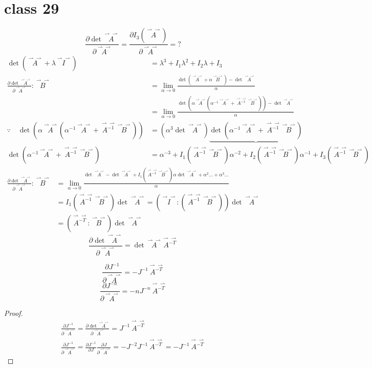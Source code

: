 \documentclass[12pt, a4paper, oneside, UTF8]{ctexbook}  %
\newcommand{\pa}{\partial}
\newcommand{\vvec}{\overset{\rightharpoonup\!\!\!\! \rightharpoonup}}
\begin{document}
\section{class 29}
\begin{defn}
    \[\frac{\pa \det\vvec{A}}{\pa\vvec{A}}=\frac{\pa I_3(\vvec{A})}{\pa\vvec{A}}=?\]
    \begin{align*}
        \det\left(\vvec{A}+\lambda\vvec{I}\right)
        &=\lambda^3 + I_1 \lambda^2 + I_2 \lambda + I_3\\
        \frac{\pa \det\vvec{A}}{\pa\vvec{A}}:\vvec{B}
        &=\lim_{\alpha\rightarrow0}\frac{\det\left(\vvec{A}+\alpha\vvec{B}\right)
        -\det\vvec{A}}{\alpha}\\
        &=\lim_{\alpha\rightarrow0}\frac{\det\left(\alpha\vvec{A}(\alpha^{-1}\vvec{A}+\vvec{A^{-1}}\vvec{B})\right)
        -\det\vvec{A}}{\alpha}\\
        \because\quad\det\left(\alpha\vvec{A}(\alpha^{-1}\vvec{A}+\vvec{A^{-1}}\vvec{B})\right)
        &=\left(\alpha^3\det\vvec{A}\right)\underbrace{\det\left(\alpha^{-1}\vvec{A}+\vvec{A^{-1}}\vvec{B}\right)}\\
        \det\left(\alpha^{-1}\vvec{A}+\vvec{A^{-1}}\vvec{B}\right)&=\alpha^{-3} + I_1(\vvec{A^{-1}}\vvec{B}) \alpha^{-2} 
        + I_2(\vvec{A^{-1}}\vvec{B}) \alpha^{-1} + I_3(\vvec{A^{-1}}\vvec{B})
    \end{align*}
    \begin{align*}
        \frac{\pa \det\vvec{A}}{\pa\vvec{A}}:\vvec{B}
        &=\lim_{\alpha\rightarrow0}\frac{\det\vvec{A}-\det\vvec{A}+I_1(\vvec{A^{-1}}\vvec{B}) \alpha\det\vvec{A} 
        +\alpha^2\dots + \alpha^3\dots}{\alpha}\\
        &=I_1(\vvec{A^{-1}}\vvec{B}) \det\vvec{A}=\left(\vvec{I}:(\vvec{A^{-1}}\vvec{B}) \right)\det\vvec{A}\\
        &=\left(\vvec{A^{-T}}:\vvec{B}\right)\det\vvec{A}
    \end{align*}
    \[\boxed{\frac{\pa \det\vvec{A}}{\pa\vvec{A}}=\det\vvec{A}\vvec{A^{-T}}}\]
\end{defn}
\begin{corollary}
    \[\frac{\pa J^{-1}}{\pa\vvec{A}}=-J^{-1}\vvec{A^{-T}}\]
    \[\boxed{\frac{\pa J^{-n}}{\pa\vvec{A}}=-nJ^{-n}\vvec{A^{-T}}}\]
    \begin{proof}
        \begin{gather*}
            \frac{\pa J^{-1}}{\pa\vvec{A}}=\frac{\pa \det\vvec{A}}{\pa\vvec{A}}
            =J^{-1}\vvec{A^{-T}}\\
            \frac{\pa J^{-1}}{\pa\vvec{A}}=\frac{\pa J^{-1}}{\pa J}\frac{\pa J}{\pa\vvec{A}}
            =-J^{-2}J^{-1}\vvec{A^{-T}}=-J^{-1}\vvec{A^{-T}}
        \end{gather*}
    \end{proof}
\end{corollary}
\end{document}
